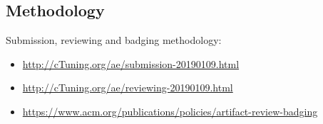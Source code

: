 % 
\subsection{Methodology}

Submission, reviewing and badging methodology:

\begin{itemize}
  \item \url{http://cTuning.org/ae/submission-20190109.html}
  \item \url{http://cTuning.org/ae/reviewing-20190109.html}
  \item \url{https://www.acm.org/publications/policies/artifact-review-badging}
\end{itemize}

